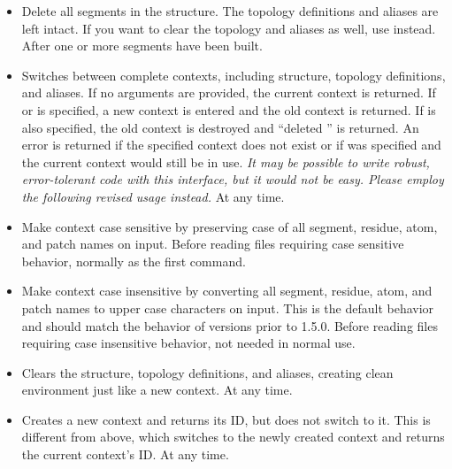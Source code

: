 \begin{itemize}
\item {}
{Delete all segments in the structure.  The topology definitions and 
aliases are left intact.  If you want to clear the topology and aliases
as well, use  instead.}
{}
{After one or more segments have been built.}

\item {}
{Switches between complete contexts, including structure, topology definitions,
and aliases.  If no arguments are provided, the current context is returned.
If  or  is specified, a new context is entered and
the old context is returned.  If  is also specified, the old
context is destroyed and ``deleted '' is returned.  An error
is returned if the specified context does not exist or if  was
specified and the current context would still be in use.
{\em It may be possible to write robust, error-tolerant code with this
interface, but it would not be easy.  Please employ the following revised
 usage instead.}}
{}
{At any time.}

\item {}
{Make context case sensitive by preserving case of all segment, residue,
atom, and patch names on input.}
{}
{Before reading files requiring case sensitive behavior,
normally as the first command.}

\item {}
{Make context case insensitive by converting all segment, residue, atom,
and patch names to upper case characters on input.  This is the default
behavior and should match the behavior of versions prior to 1.5.0.}
{}
{Before reading files requiring case insensitive behavior,
not needed in normal use.}

\item {}
{Clears the structure, topology definitions, and aliases, creating
clean environment just like a new context.}
{}
{At any time.}

\item {}
{Creates a new context and returns its ID, but does not switch to it.
This is different from  above, which switches to
the newly created context and returns the current context's ID.}
{}
{At any time.}


\end{itemize}
